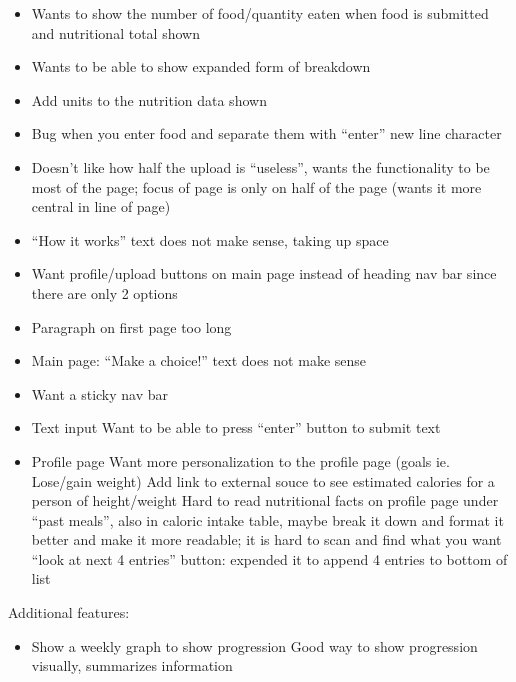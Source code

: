 \documentclass[12pt, titlepage]{article}
\begin{document}
	\begin{itemize}
		\item Wants to show the number of food/quantity eaten when food is submitted and nutritional total
		shown
		\item Wants to be able to show expanded form of breakdown
		\item Add units to the nutrition data shown
		\item Bug when you enter food and separate them with “enter” new line character
		\item Doesn’t like how half the upload is “useless”, wants the functionality to be most of the page;
		focus of page is only on half of the page (wants it more central in line of page)
		\item “How it works” text does not make sense, taking up space
		\item Want profile/upload buttons on main page instead of heading nav bar since there are only 2
		options
		\item Paragraph on first page too long
		\item Main page: “Make a choice!” text does not make sense
		\item Want a sticky nav bar
		\item Text input
		\subitem Want to be able to press “enter” button to submit text
		\item Profile page
		\subitem Want more personalization to the profile page (goals ie. Lose/gain weight)
		\subitem Add link to external souce to see estimated calories for a person of height/weight
		\subitem Hard to read nutritional facts on profile page under “past meals”, also in caloric intake
		table, maybe break it down and format it better and make it more readable; it is hard to
		scan and find what you want
		\subitem “look at next 4 entries” button: expended it to append 4 entries to bottom of list
	\end{itemize}
	Additional features:
	\begin{itemize}
		\item Show a weekly graph to show progression 
		\subitem Good way to show progression visually, summarizes information
	\end{itemize}
\end{document}

